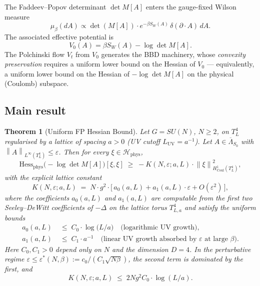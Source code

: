 \documentclass[11pt,a4paper]{amsart}
\newtheorem{theorem}{Theorem}[section]
\theoremstyle{definition}
\newcommand{\norm}[1]{\left\lVert#1\right\rVert}
\newcommand{\Coul}{\mathrm{Coul}}
\newcommand{\Hess}{\mathrm{Hess}}
\begin{document}
The Faddeev--Popov determinant $\det M[A]$ enters the gauge-fixed Wilson measure
\[
\mu_\beta(dA) \propto \det(M[A]) \cdot e^{-\beta S_W(A)}\,\delta(\partial \cdot A)\, dA.
\]
The associated effective potential is
\[
V_0(A) = \beta S_W(A) - \log\det M[A].
\]
The Polchinski flow $V_t$ from $V_0$ generates the BBD machinery, whose
\emph{convexity preservation} requires a uniform lower bound on the Hessian
of $V_0$ — equivalently, a uniform lower bound on the Hessian of $-\log\det M[A]$
on the physical (Coulomb) subspace.

\subsection{Main result}

\begin{theorem}[Uniform FP Hessian Bound]\label{thm:main}
Let $G = SU(N)$, $N \geq 2$, on $T^4_L$ regularised by a lattice
of spacing $a > 0$ (UV cutoff $L_{\mathrm{UV}} = a^{-1}$). Let
$A \in \overline\Lambda_{S_0}$ with $\norm{A}_{L^\infty(T^4_L)} \leq \varepsilon$.
Then for every $\xi \in \mathcal H_{\mathrm{phys}}$,
\begin{equation}\label{eq:main-bound}
\Hess_{\mathrm{phys}}\bigl(-\log\det M[A]\bigr)[\xi, \xi]
\;\geq\;
-K(N, \varepsilon; a, L)\cdot \norm{\xi}^2_{H^1_{\Coul}(T^4_L)},
\end{equation}
with the explicit lattice constant
\begin{equation}\label{eq:K-formula}
K(N, \varepsilon; a, L) \;=\; N \cdot g^2 \cdot \bigl[\,a_0(a, L) + a_1(a, L) \cdot \varepsilon + O(\varepsilon^2)\,\bigr],
\end{equation}
where the coefficients $a_0(a,L)$ and $a_1(a, L)$ are computable from the
first two Seeley--DeWitt coefficients of $-\Delta$ on the
lattice torus $T^4_{L,a}$ and satisfy the uniform bounds
\begin{align*}
a_0(a, L) &\;\leq\; C_0 \cdot \log\bigl(L/a\bigr)\quad \text{(logarithmic UV growth),}\\
a_1(a, L) &\;\leq\; C_1 \cdot a^{-1} \quad \text{(linear UV growth absorbed by $\varepsilon$ at large } \beta\text{).}
\end{align*}
Here $C_0, C_1 > 0$ depend only on $N$ and the dimension $D=4$. In the perturbative
regime $\varepsilon \leq \varepsilon^*(N, \beta) := c_0/(C_1 \sqrt{N\beta})$,
the second term is dominated by the first, and
\[
K(N, \varepsilon; a, L) \;\leq\; 2 N g^2 C_0 \cdot \log(L/a).
\]
\end{theorem}
\end{document}
